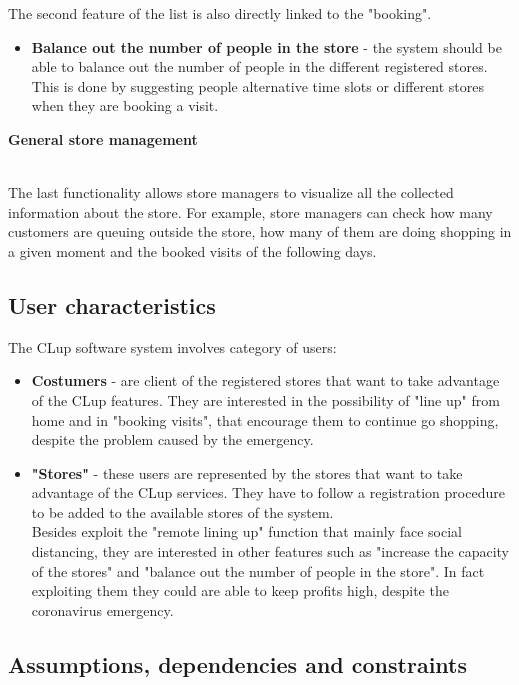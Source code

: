 \documentclass[]{article}
\begin{document}
The second feature of the list is also directly linked to the "booking".
\begin{itemize}
	\renewcommand{\labelitemi}{$-$}
	\item \textbf{Balance out the number of people in the store} - the system should be able to balance out the number of people in the different registered stores. This is done by suggesting people alternative time slots or different stores when they are booking a visit.
\end{itemize}
\bigskip
\begin{large}
	\textbf{General store management}
\end{large}
\smallskip
\\
The last functionality allows store managers to visualize all the collected information about the store. For example, store managers can check how many customers are queuing outside the store, how many of them are doing shopping in a given moment and the booked visits of the following days.  

\newpage

\subsection{User characteristics}
The CLup software system involves category of users:
\begin{itemize}
	\renewcommand{\labelitemi}{$-$}
	\item \textbf{Costumers} - are client of the registered stores that want to take advantage of the CLup features. They are interested in the possibility of "line up" from home and in "booking visits", that encourage them to continue go shopping, despite the problem caused by the emergency.
	
	\item \textbf{"Stores"} - these users are represented by the stores that want to take advantage of the CLup services. They have to follow a registration procedure to be added to the available stores of the system. 
	\\Besides exploit the "remote lining up" function that mainly face social distancing, they are interested in other features such as "increase the capacity of the stores" and "balance out the number of people in the store". In fact exploiting them they could are able to keep profits high, despite the coronavirus emergency. 		
\end{itemize}


\subsection{Assumptions, dependencies and constraints}
\end{document}
